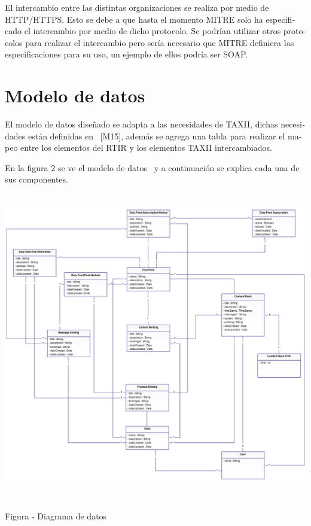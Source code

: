\documentclass[11pt]{article}
\newcounter{Figura}
\renewcommand\theFigura{\arabic{Figura}}
\begin{document}
\foreignlanguage{spanish}{El intercambio entre las distintas organizaciones se realiza por medio de HTTP/HTTPS. Esto se
debe a que hasta el momento MITRE solo ha especificado el intercambio por medio de dicho protocolo. Se podrían utilizar
otros protocolos para realizar el intercambio pero sería necesario que MITRE definiera las especificaciones para su
uso, un ejemplo de ellos podría ser SOAP.}


\bigskip

\section[Modelo de datos]{\foreignlanguage{spanish}{Modelo de datos}}
\foreignlanguage{spanish}{El modelo de datos diseñado se adapta a las necesidades de TAXII, dichas necesidades están
definidas en \ [M15], además se agrega una tabla para realizar el mapeo entre los elementos del RTIR y los elementos
TAXII intercambiados.}

\foreignlanguage{spanish}{En la figura 2 se ve el modelo de datos \ y a continuación se explica cada una de sus
componentes.}

 \includegraphics[width=5.7638in,height=5.3126in]{Diseno21-img/Diseno21-img004.png} 
{\centering\bfserie
\foreignlanguage{spanish}{Figura }\stepcounter{Figura}{\theFigura}\foreignlanguage{spanish}{ - Diagrama de datos}
\par}
\end{document}
